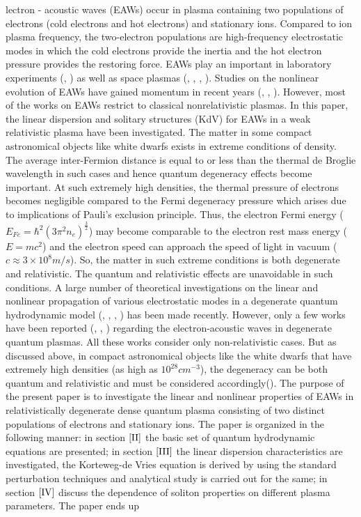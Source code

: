 \documentclass[journal]{IEEEtran}
\begin{document}
lectron - acoustic waves (EAWs) occur in plasma containing two populations of electrons (cold electrons and hot electrons) and stationary ions. Compared to ion plasma frequency, the two-electron populations are high-frequency electrostatic modes in which the cold electrons provide the inertia and the hot electron pressure provides the restoring force. EAWs play an important in laboratory experiments (\cite{henry1972propagation}, \cite{ditmire1998explosion}) as well as space plasmas (\cite{ang2007ultrashort}, \cite{barnes2003surface}, \cite{feldman1975solar}, \cite{feldman1983electron}). Studies on the nonlinear evolution of EAWs have gained momentum in recent years (\cite{singh2001generation}, \cite{kourakis2004electron}, \cite{bains2011modulational}). However, most of the works on EAWs restrict to classical nonrelativistic plasmas. In this paper, the linear dispersion and solitary structures (KdV) for EAWs in a weak relativistic plasma have been investigated. The matter in some compact astronomical objects like white dwarfs exists in extreme conditions of density. The average inter-Fermion distance is equal to or less than the thermal de Broglie wavelength in such cases and hence quantum degeneracy effects become important. At such extremely high densities, the thermal pressure of electrons becomes negligible compared to the Fermi degeneracy pressure which arises due to implications of Pauli’s exclusion principle. Thus, the electron Fermi energy ($E_{Fe}=\hbar^2 (3\pi^2 n_e )^\frac{3}{2}$) may become comparable to the electron rest mass energy ($E=mc^2$) and the electron speed can approach the speed of light in vacuum ($c\approx3\times10^8 m/s$). So, the matter in such extreme conditions is both degenerate and relativistic. The quantum and relativistic effects are unavoidable in such conditions. A large number of theoretical investigations on the linear and nonlinear propagation of various electrostatic modes in a degenerate quantum hydrodynamic model (\cite{manfredi2005model}, \cite{sahu2006electron}, \cite{sahu2007cylindrical}, \cite{shukla2010nonlinear}) has been made recently. However, only a few works have been reported (\cite{sah2009nonlinear}, \cite{misra2007electron}, \cite{bhowmik2007oblique}) regarding the electron-acoustic waves in degenerate quantum plasmas. All these works consider only non-relativistic cases. But as discussed above, in compact astronomical objects like the white dwarfs that have extremely high densities (as high as $10^{28} cm^{-3}$), the degeneracy can be both quantum and relativistic and must be considered accordingly(\cite{chandra2013electron}). The purpose of the present paper is to investigate the linear and nonlinear properties of EAWs in relativistically degenerate dense quantum plasma consisting of two distinct populations of electrons and stationary ions. The paper is organized in the following manner: in section $\ref{II}$ the basic set of quantum hydrodynamic equations are presented; in section $\ref{III}$ the linear dispersion characteristics are investigated, the Korteweg-de Vries equation is derived by using the standard perturbation techniques and analytical study is carried out for the same; in section $\ref{IV}$ discuss the dependence of soliton properties on different plasma parameters.  The paper ends up 
\end{document}
